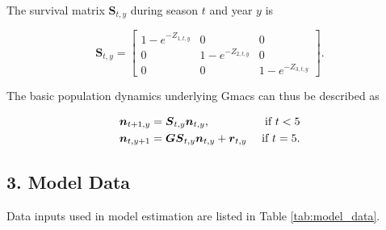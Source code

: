 \documentclass[]{article}
\begin{document}
The survival matrix \(\boldsymbol{S}_{t,y}\) during season \(t\) and
year \(y\) is

\begin{equation}
  \boldsymbol{S}_{t,y} = \left[ \begin{array}{ccc}
    1-e^{-Z_{1,t,y}} & 0 & 0 \\
    0 & 1-e^{-Z_{2,t,y}} & 0 \\
    0 & 0 & 1-e^{-Z_{3,t,y}} \end{array} \right].
\end{equation}

The basic population dynamics underlying Gmacs can thus be described as

\begin{align}
    \boldsymbol{n}_{t+1,y} &= \boldsymbol{S}_{t,y} \boldsymbol{n}_{t,y}, &\text{ if } t<5 \notag\\
    \boldsymbol{n}_{t,y+1} &= \boldsymbol{G} \boldsymbol{S}_{t,y} \boldsymbol{n}_{t,y} + \boldsymbol{r}_{t,y} &\text{ if } t=5.
\end{align}

\subsection{3. Model Data}\label{model-data}

Data inputs used in model estimation are listed in Table
\ref{tab:model_data}.
\end{document}
